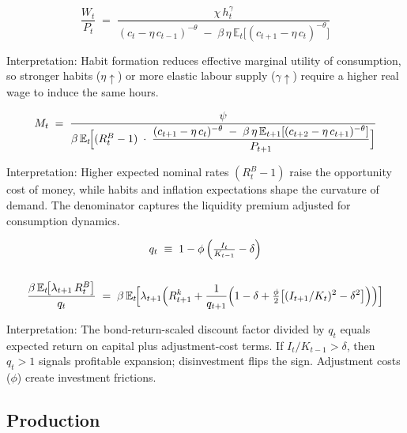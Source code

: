 \documentclass[11pt,preprint]{elsarticle}
\numberwithin{equation}{section}
\numberwithin{figure}{section}
\numberwithin{table}{section}
\begin{document}
\begin{equation}\label{labourSupply}
  \frac{W_t}{P_t}
  \;=\;
  \frac{\chi\,h_t^{\gamma}}
       {(c_t - \eta\,c_{t-1})^{-\theta}
        \;-\;
        \beta\,\eta\,\mathbb{E}_t\!\bigl[(c_{t+1} - \eta\,c_t)^{-\theta}\bigr]}
\end{equation}

Interpretation: Habit formation reduces effective marginal utility of
consumption, so stronger habits (\(\eta\uparrow\)) or more elastic
labour supply (\(\gamma\uparrow\)) require a higher real wage to induce
the same hours.

\begin{equation}\label{money_demand}
  M_t
  \;=\;
  \frac{\psi}
       {\beta\,\mathbb{E}_t\!\Bigl[
         (R_t^B - 1)
         \;\cdot\;
         \dfrac{(c_{t+1} - \eta\,c_t)^{-\theta}
               \;-\;
               \beta\,\eta\,\mathbb{E}_{t+1}[(c_{t+2} - \eta\,c_{t+1})^{-\theta}]}
              {P_{t+1}}
       \Bigr]}
\end{equation}

Interpretation: Higher expected nominal rates \((R_t^B - 1)\) raise the
opportunity cost of money, while habits and inflation expectations shape
the curvature of demand. The denominator captures the liquidity premium
adjusted for consumption dynamics.

\begin{equation}\label{capital_euler}
  \begin{gathered}
  q_t \;\equiv\; 1 - \phi\,\Bigl(\tfrac{I_t}{K_{t-1}} - \delta\Bigr) \\
  \\
  \frac{\beta\,\mathbb{E}_t\!\bigl[\lambda_{t+1}\,R_t^B\bigr]}{q_t}
  \;=\;
  \beta\,\mathbb{E}_t\!\Bigl[
    \lambda_{t+1}\Bigl(
      R_{t+1}^k
      + \frac{1}{q_{t+1}}
        \Bigl(
          1 - \delta
          + \tfrac{\phi}{2}\bigl[(I_{t+1}/K_t)^2 - \delta^2\bigr]
        \Bigr)
    \Bigr)
  \Bigr]
  \end{gathered}
\end{equation}

Interpretation: The bond-return-scaled discount factor divided by
\(q_t\) equals expected return on capital plus adjustment-cost terms. If
\(I_t/K_{t-1}>\delta\), then \(q_t>1\) signals profitable expansion;
disinvestment flips the sign. Adjustment costs (\(\phi\)) create
investment frictions.

\subsection{Production}\label{production}
\end{document}

